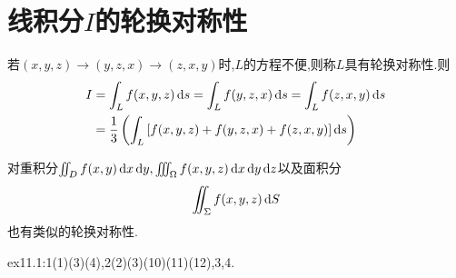 \section{线积分$I$的轮换对称性}

若$(x,y,z) \to (y,z,x) \to (z,x,y)$时,$L$的方程不便,则称$L$具有轮换对称性.则
\begin{align*}
    I &= \int_L f(x,y,z) \operatorname{d\!} s = \int_L f(y,z,x) \operatorname{d\!} s = \int_L f(z,x,y) \operatorname{d\!} s\\
    &= \frac{1}{3} \left( \int_L \left[ f(x,y,z) + f(y,z,x) + f(z,x,y) \right] \operatorname{d\!} s \right)
\end{align*}

对重积分$\iint_D f(x,y) \operatorname{d\!} x \operatorname{d\!} y, \iiint_\Omega f(x,y,z) \operatorname{d\!} x \operatorname{d\!} y \operatorname{d\!} z$以及面积分$$\iint_\Sigma f(x,y,z) \operatorname{d\!} S$$也有类似的轮换对称性.

\begin{homework}
    ex11.1:1(1)(3)(4),2(2)(3)(10)(11)(12),3,4.
\end{homework}























